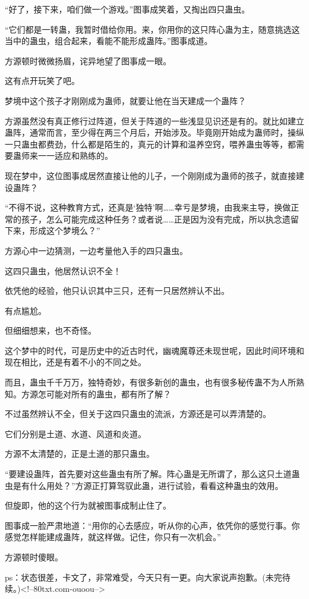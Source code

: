 \begin{this_body}
“好了，接下来，咱们做一个游戏。”图事成笑着，又掏出四只蛊虫。

“它们都是一转蛊，我暂时借给你用。来，你用你的这只阵心蛊为主，随意挑选这当中的蛊虫，组合起来，看能不能形成蛊阵。”图事成道。

方源顿时微微扬眉，诧异地望了图事成一眼。

这有点开玩笑了吧。

梦境中这个孩子才刚刚成为蛊师，就要让他在当天建成一个蛊阵？

方源虽然没有真正修行过阵道，但关于阵道的一些浅显见识还是有的。就比如建立蛊阵，通常而言，至少得在两三个月后，开始涉及。毕竟刚开始成为蛊师时，操纵一只蛊虫都费劲，什么都是陌生的，真元的计算和温养空窍，喂养蛊虫等等，都需要蛊师来一一适应和熟练的。

现在梦中，这位图事成居然直接让他的儿子，一个刚刚成为蛊师的孩子，就直接建设蛊阵？

“不得不说，这种教育方式，还真是‘独特’啊……幸亏是梦境，由我来主导，换做正常的孩子，怎么可能完成这种任务？或者说……正是因为没有完成，所以执念遗留下来，形成这个梦境么？”

方源心中一边猜测，一边考量他入手的四只蛊虫。

这四只蛊虫，他居然认识不全！

依凭他的经验，他只认识其中三只，还有一只居然辨认不出。

有点尴尬。

但细细想来，也不奇怪。

这个梦中的时代，可是历史中的近古时代，幽魂魔尊还未现世呢，因此时间环境和现在相比，还是有着不小的不同之处。

而且，蛊虫千千万万，独特奇妙，有很多新创的蛊虫，也有很多秘传蛊不为人所熟知。方源怎可能对所有的蛊虫，都有所了解？

不过虽然辨认不全，但关于这四只蛊虫的流派，方源还是可以弄清楚的。

它们分别是土道、水道、风道和炎道。

方源不太清楚的，正是土道的那只蛊虫。

“要建设蛊阵，首先要对这些蛊虫有所了解。阵心蛊是无所谓了，那么这只土道蛊虫是有什么用处？”方源正打算驾驭此蛊，进行试验，看看这种蛊虫的效用。

但旋即，他的这个行为就被图事成制止住了。

图事成一脸严肃地道：“用你的心去感应，听从你的心声，依凭你的感觉行事。你感觉怎样能建成蛊阵，就这样做。记住，你只有一次机会。”

方源顿时傻眼。

ps：状态很差，卡文了，非常难受，今天只有一更。向大家说声抱歉。(未完待续。)<!--80txt.com-ouoou-->

\end{this_body}

